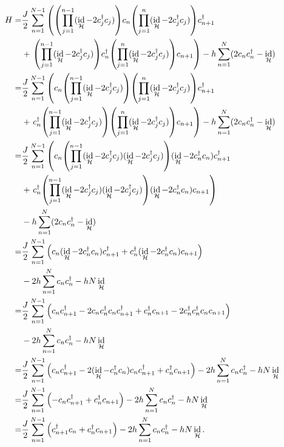 \documentclass{article}
\DeclareMathOperator{\id}{id}
\begin{document}
\begin{align}\label{eq:hamiltoniano_2}
\begin{split}
H=&\frac{J}{2}\sum_{n=1}^{N-1}\left(\qty(\prod_{j=1}^{n-1}(\id_\mathcal{H}-2c_j^\dagger c_j))c_n\qty(\prod_{j=1}^{n}(\id_\mathcal{H}-2c_j^\dagger c_j))c_{n+1}^\dagger\right.\\
&+\left.\qty(\prod_{j=1}^{n-1}(\id_\mathcal{H}-2c_j^\dagger c_j))c_n^\dagger\qty(\prod_{j=1}^{n}(\id_\mathcal{H}-2c_j^\dagger c_j))c_{n+1}\right)-h\sum_{n=1}^N(2c_nc_n^\dagger-\id_\mathcal{H})\\
=&\frac{J}{2}\sum_{n=1}^{N-1}\left(c_n\qty(\prod_{j=1}^{n-1}(\id_\mathcal{H}-2c_j^\dagger c_j))\qty(\prod_{j=1}^{n}(\id_\mathcal{H}-2c_j^\dagger c_j))c_{n+1}^\dagger\right.\\
&+\left.c_n^\dagger\qty(\prod_{j=1}^{n-1}(\id_\mathcal{H}-2c_j^\dagger c_j))\qty(\prod_{j=1}^{n}(\id_\mathcal{H}-2c_j^\dagger c_j))c_{n+1}\right)-h\sum_{n=1}^N(2c_nc_n^\dagger-\id_\mathcal{H})\\
=&\frac{J}{2}\sum_{n=1}^{N-1}\left(c_n\qty(\prod_{j=1}^{n-1}(\id_\mathcal{H}-2c_j^\dagger c_j)(\id_\mathcal{H}-2c_j^\dagger c_j))(\id_\mathcal{H}-2c_n^\dagger c_n)c_{n+1}^\dagger\right.\\
&+\left.c_n^\dagger\qty(\prod_{j=1}^{n-1}(\id_\mathcal{H}-2c_j^\dagger c_j)(\id_\mathcal{H}-2c_j^\dagger c_j))(\id_\mathcal{H}-2c_n^\dagger c_n)c_{n+1}\right)\\
&-h\sum_{n=1}^N(2c_nc_n^\dagger-\id_\mathcal{H})\\
=&\frac{J}{2}\sum_{n=1}^{N-1}\qty(c_n(\id_\mathcal{H}-2c_n^\dagger c_n)c_{n+1}^\dagger+c_n^\dagger(\id_\mathcal{H}-2c_n^\dagger c_n)c_{n+1})\\
&-2h\sum_{n=1}^Nc_nc_n^\dagger-hN\id_\mathcal{H}\\
=&\frac{J}{2}\sum_{n=1}^{N-1}\qty(c_nc_{n+1}^\dagger-2c_nc_n^\dagger c_nc_{n+1}^\dagger+c_n^\dagger c_{n+1}-2c_n^\dagger c_n^\dagger c_nc_{n+1})\\
&-2h\sum_{n=1}^Nc_nc_n^\dagger-hN\id_\mathcal{H}\\
=&\frac{J}{2}\sum_{n=1}^{N-1}\qty(c_nc_{n+1}^\dagger-2(\id_\mathcal{H}-c_n^\dagger c_n) c_nc_{n+1}^\dagger+c_n^\dagger c_{n+1})-2h\sum_{n=1}^Nc_nc_n^\dagger-hN\id_\mathcal{H}\\
=&\frac{J}{2}\sum_{n=1}^{N-1}\qty(-c_nc_{n+1}^\dagger+c_n^\dagger c_{n+1})-2h\sum_{n=1}^Nc_nc_n^\dagger-hN\id_\mathcal{H}\\
=&\frac{J}{2}\sum_{n=1}^{N-1}\qty(c_{n+1}^\dagger c_n+c_n^\dagger c_{n+1})-2h\sum_{n=1}^Nc_nc_n^\dagger-hN\id_\mathcal{H}.\\
\end{split}
\end{align}
\end{document}
